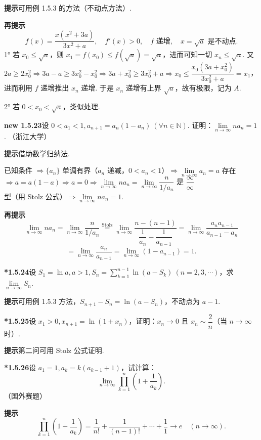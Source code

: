 \documentclass[UTF8,12pt,a4paper,fontset=fandol]{ctexart}
\begin{document}
\noindent\textbf{提示}\quad 可用例 1.5.3 的方法（不动点方法）.

\noindent\textbf{再提示}\quad
\[
  f(x)=\frac{x(x^2+3a)}{3x^2+a},\quad f'(x)>0,\quad f\text{ 递增},\quad x=\sqrt a\text{ 是不动点}.
\]
1° 若 $x_0\le \sqrt a$，则 $x_1=f(x_0)\le f(\sqrt a)=\sqrt a$，进而可知一切 $x_n\le \sqrt a$. 又 $2a\ge 2x_0^2\Rightarrow 3a-a\ge 3x_0^2-x_0^2\Rightarrow 3a+x_0^2\ge 3x_0^2+a\Rightarrow x_0\le \dfrac{x_0(3a+x_0^2)}{3x_0^2+a}=x_1$，进而利用 $f$ 递增推出 $x_n$ 递增. 于是 $x_n$ 递增有上界 $\sqrt a$，故有极限，记为 $A$.

2° 若 $0<x_0<\sqrt a$，类似处理.

\noindent\textbf{new 1.5.23}\quad 设 $0<a_1<1,a_{n+1}=a_n(1-a_n)\ (\forall n\in\mathbb{N})$. 证明：$\lim\limits_{n\to\infty}na_n=1$. （浙江大学）

\noindent\textbf{提示}\quad 借助数学归纳法.

已知条件 $\Rightarrow \{a_n\}$ 单调有界（$a_n$ 递减，$0<a_n<1$）$\Rightarrow \lim\limits_{n\to\infty}a_n=a$ 存在 $\Rightarrow a=a(1-a)\Rightarrow a=0\Rightarrow \lim\limits_{n\to\infty}na_n=\lim\limits_{n\to\infty}\dfrac{n}{1/a_n}$ 是 $\dfrac{\infty}{\infty}$ 型（用 Stolz 公式）$\Rightarrow \lim\limits_{n\to\infty}na_n=1$.

\noindent\textbf{再提示}\quad
\[
  \lim_{n\to\infty}na_n
  =\lim_{n\to\infty}\frac n{1/a_n}
  \stackrel{\mathrm{Stolz}}{=}
  \lim_{n\to\infty}\frac{n-(n-1)}{\dfrac1{a_n}-\dfrac1{a_{n-1}}}
  =\lim_{n\to\infty}\frac{a_na_{n-1}}{a_{n-1}-a_n}
\]
\[
  =\lim_{n\to\infty}\frac{a_n}{a_{n-1}}
  =\lim_{n\to\infty}(1-a_{n-1})=1.
\]

\noindent\textbf{*1.5.24}\quad 设 $S_1=\ln a,a>1,S_n=\sum\limits_{k=1}^{n-1}\ln(a-S_k)\ (n=2,3,\cdots)$，求 $\lim\limits_{n\to\infty}S_n$.

\noindent\textbf{提示}\quad 可用例 1.5.3 方法，$S_{n+1}-S_n=\ln(a-S_n)$，不动点为 $a-1$.

\noindent\textbf{*1.5.25}\quad 设 $x_1>0,x_{n+1}=\ln(1+x_n)$，证明：$x_n\to0$ 且 $x_n\sim \dfrac2n$（当 $n\to\infty$ 时）.

\noindent\textbf{提示}\quad 第二问可用 Stolz 公式证明.

\noindent\textbf{*1.5.26}\quad 设 $a_1=1,a_k=k(a_{k-1}+1)$，试计算：
\[
  \lim_{n\to\infty}\prod_{k=1}^n\left(1+\frac1{a_k}\right).
\]
（国外赛题）

\noindent\textbf{提示}\quad
\[
  \prod_{k=1}^n\left(1+\frac1{a_k}\right)
  =\frac1{n!}+\frac1{(n-1)!}+\cdots+\frac11\to e\quad (n\to\infty).
\]
\end{document}
